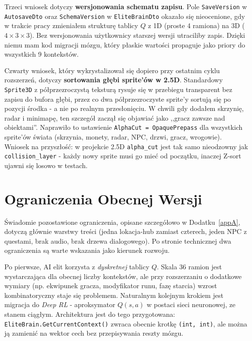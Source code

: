 Trzeci wniosek dotyczy \textbf{wersjonowania schematu zapisu}. Pole \texttt{SaveVersion} w \texttt{AutosaveDto} oraz \texttt{SchemaVersion} w \texttt{EliteBrainDto} okazało się nieocenione, gdy w trakcie pracy zmieniałem strukturę tablicy $Q$ z 1D (proste 4 ramiona) na 3D ($4 \times 3 \times 3$). Bez wersjonowania użytkownicy starszej wersji utraciliby zapis. Dzięki niemu mam kod migracji mózgu, który płaskie wartości propaguje jako priory do wszystkich 9 kontekstów.

Czwarty wniosek, który wykrystalizował się dopiero przy ostatnim cyklu rozszerzeń, dotyczy \textbf{sortowania głębi sprite'ów w 2.5D}. Standardowy \texttt{Sprite3D} z półprzezroczystą teksturą rysuje się w przebiegu transparent bez zapisu do bufora głębi, przez co dwa półprzezroczyste sprite'y sortują się po pozycji środka - a nie po realnym przesłonięciu. W chwili gdy dodałem skrzynię, radar i minimapę, ten szczegół zaczął się objawiać jako ,,gracz zawsze nad obiektami''. Naprawiło to ustawienie \texttt{AlphaCut = OpaquePrepass} dla wszystkich sprite'ów świata (skrzynia, monety, radar, NPC, drzwi, gracz, wrogowie). Wniosek na przyszłość: w projekcie 2.5D \texttt{alpha\_cut} jest tak samo nieodzowny jak \texttt{collision\_layer} - każdy nowy sprite musi go mieć od początku, inaczej Z-sort ujawni się losowo w testach.

\section{Ograniczenia Obecnej Wersji}

Świadomie pozostawione ograniczenia, opisane szczegółowo w Dodatku~\ref{appA}, dotyczą głównie warstwy treści (jedna lokacja-hub zamiast czterech, jeden NPC z questami, brak audio, brak drzewa dialogowego). Po stronie technicznej dwa ograniczenia są warte wskazania jako kierunek rozwoju.

Po pierwsze, AI elit korzysta z \emph{dyskretnej} tablicy $Q$. Skala 36 ramion jest wystarczająca dla obecnej liczby kontekstów, ale przy rozszerzaniu o dodatkowe wymiary (np. ekwipunek gracza, modyfikator runu, fazę starcia) wzrost kombinatoryczny staje się problemem. Naturalnym kolejnym krokiem jest migracja do \emph{Deep RL} - aproksymator $Q(s,a)$ w postaci sieci neuronowej, ze stanem ciągłym. Architektura jest do tego przygotowana: \texttt{EliteBrain.GetCurrentContext()} zwraca obecnie krotkę \texttt{(int, int)}, ale można ją zamienić na wektor cech bez przepisywania reszty mózgu.


